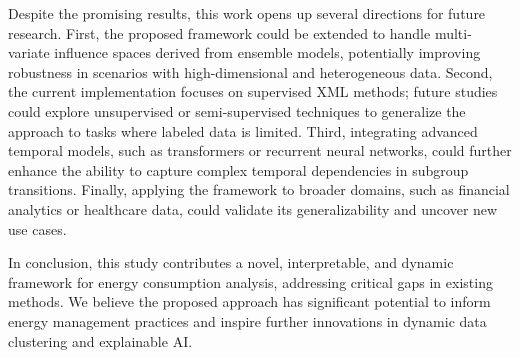 \documentclass[final,5p,times,twocolumn,numbers]{elsarticle}
\begin{document}
Despite the promising results, this work opens up several directions for future research. First, the proposed framework could be extended to handle multi-variate influence spaces derived from ensemble models, potentially improving robustness in scenarios with high-dimensional and heterogeneous data. Second, the current implementation focuses on supervised XML methods; future studies could explore unsupervised or semi-supervised techniques to generalize the approach to tasks where labeled data is limited. Third, integrating advanced temporal models, such as transformers or recurrent neural networks, could further enhance the ability to capture complex temporal dependencies in subgroup transitions. Finally, applying the framework to broader domains, such as financial analytics or healthcare data, could validate its generalizability and uncover new use cases.

In conclusion, this study contributes a novel, interpretable, and dynamic framework for energy consumption analysis, addressing critical gaps in existing methods. We believe the proposed approach has significant potential to inform energy management practices and inspire further innovations in dynamic data clustering and explainable AI.



\end{document}
